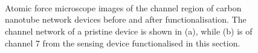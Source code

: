 \documentclass[
  a4paper,
]{scrbook}
\begin{document}
\begin{figure}
\begin{minipage}[t]{0.01\linewidth}
{~

}

\end{minipage}%
%
\begin{minipage}[t]{0.03\linewidth}

{\centering 


}

\end{minipage}%
%
\begin{minipage}[t]{0.01\linewidth}

{\centering 

~

}

\end{minipage}%
%
\begin{minipage}[t]{0.45\linewidth}

{\centering 


}

\end{minipage}%
%
\begin{minipage}[t]{0.01\linewidth}

{\centering 

~

}

\end{minipage}%

\caption{\label{fig-working-OR22a-AFM}Atomic force microscope images of
the channel region of carbon nanotube network devices before and after
functionalisation. The channel network of a pristine device is shown in
(a), while (b) is of channel 7 from the sensing device functionalised in
this section.}

\end{figure}
\end{document}
